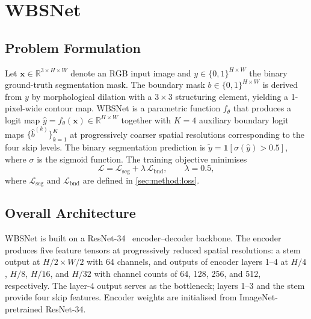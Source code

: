 \documentclass[journal]{IEEEtran}
\begin{document}
\section{WBSNet}\label{sec:method}

\subsection{Problem Formulation}\label{sec:method:problem}

Let $\mathbf{x} \in \mathbb{R}^{3 \times H \times W}$ denote an RGB input
image and $y \in \{0,1\}^{H \times W}$ the binary ground-truth segmentation
mask.
The boundary mask $b \in \{0,1\}^{H \times W}$ is derived from $y$ by
morphological dilation with a $3 \times 3$ structuring element, yielding a
1-pixel-wide contour map.
WBSNet is a parametric function $f_{\theta}$ that produces a logit map
$\hat{y} = f_{\theta}(\mathbf{x}) \in \mathbb{R}^{H \times W}$ together with
$K = 4$ auxiliary boundary logit maps
$\{\hat{b}^{(k)}\}_{k=1}^{K}$ at progressively coarser spatial resolutions
corresponding to the four skip levels.
The binary segmentation prediction is
$\tilde{y} = \mathbf{1}[\sigma(\hat{y}) > 0.5]$,
where $\sigma$ is the sigmoid function.
The training objective minimises
\begin{equation}
  \mathcal{L} = \mathcal{L}_{\text{seg}} + \lambda\,\mathcal{L}_{\text{bnd}},
  \qquad \lambda = 0.5,
  \label{eq:total_loss}
\end{equation}
where $\mathcal{L}_{\text{seg}}$ and $\mathcal{L}_{\text{bnd}}$ are defined
in \cref{sec:method:loss}.

\subsection{Overall Architecture}\label{sec:method:arch}

WBSNet is built on a ResNet-34~\cite{he2016resnet} encoder--decoder backbone.
The encoder produces five feature tensors at progressively reduced spatial
resolutions: a stem output at $H/2 \times W/2$ with 64 channels, and outputs
of encoder layers 1--4 at $H/4$, $H/8$, $H/16$, and $H/32$ with channel
counts of 64, 128, 256, and 512, respectively.
The layer-4 output serves as the bottleneck; layers 1--3 and the stem provide
four skip features.
Encoder weights are initialised from ImageNet-pretrained ResNet-34.
\end{document}
